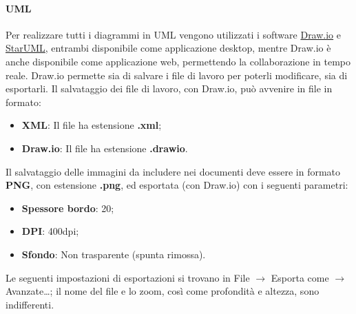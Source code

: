 \paragraph*{UML}
Per realizzare tutti i diagrammi in UML vengono utilizzati i software \href{https://draw.io}{Draw.io} e \href{http://staruml.io/}{StarUML}, entrambi disponibile come applicazione desktop, mentre Draw.io è anche disponibile come applicazione web, permettendo la collaborazione in tempo reale.
Draw.io permette sia di salvare i file di lavoro per poterli modificare, sia di esportarli.
Il salvataggio dei file di lavoro, con Draw.io, può avvenire in file in formato:
\begin{itemize}
    \item \textbf{XML}: Il file ha estensione \textbf{.xml};
    \item \textbf{Draw.io}: Il file ha estensione \textbf{.drawio}.
\end{itemize}
Il salvataggio delle immagini da includere nei documenti deve essere in formato \textbf{PNG}, con estensione \textbf{.png}, ed esportata (con Draw.io) con i seguenti parametri:
\begin{itemize}
    \item \textbf{Spessore bordo}: 20;
    \item \textbf{DPI}: 400dpi;
    \item \textbf{Sfondo}: Non trasparente (spunta rimossa).
\end{itemize}
Le seguenti impostazioni di esportazioni si trovano in File $\rightarrow$ Esporta come $\rightarrow$ Avanzate\dots; il nome del file e lo zoom, così come profondità e altezza, sono indifferenti.
